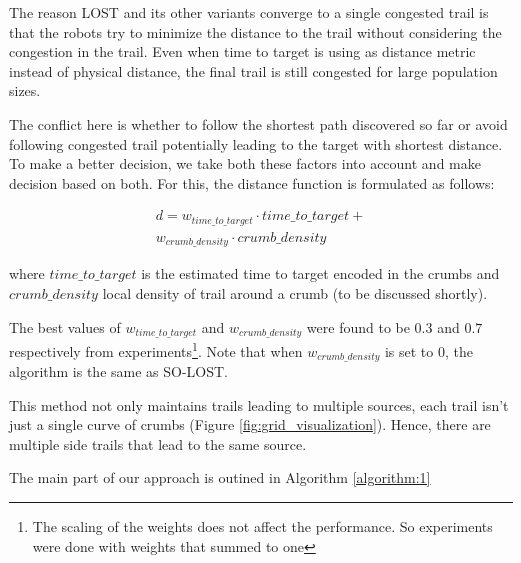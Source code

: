 \documentclass[letterpaper, 10 pt, conference]{ieeeconf}  %
\begin{document}
The reason LOST and its other variants converge to a single congested trail is that the robots try to minimize the distance to the trail without considering the congestion in the trail. Even when time to target is using as distance metric instead of physical distance, the final trail is still congested for large population sizes. 

The conflict here is whether to follow the shortest path discovered so far or avoid following congested trail potentially leading to the target with shortest distance. To make a better decision, we take both these factors into account and make decision based on both. For this, the distance function is formulated as follows:

\begin{equation}
\begin{split}
   d = w_{time\_to\_target}  \cdot time\_to\_target + \\
          w_{crumb\_density} \cdot crumb\_density
\end{split}
\end{equation}

where $time\_to\_target$ is the estimated time to target encoded in the crumbs and $crumb\_density$ local density of trail around a crumb (to be discussed shortly).

The best values of $w_{time\_to\_target}$ and $w_{crumb\_density}$ were found to be  $0.3$ and $0.7$ respectively from experiments\footnote{The scaling of the weights does not affect the performance. So experiments were done with weights that summed to one}. Note that when $w_{crumb\_density}$ is set to $0$, the algorithm is the same as SO-LOST.

This method not only maintains trails leading to multiple sources, each trail isn't just a single curve of crumbs (Figure \ref{fig:grid_visualization}). Hence, there are multiple side trails that lead to the same source.

The main part of our approach is outined in Algorithm \ref{algorithm:1}
\end{document}
